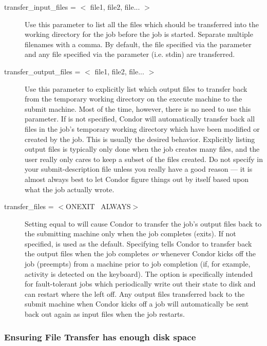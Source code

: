 \begin{description}

\item[transfer\_input\_files = $<$ file1, file2, file... $>$] Use this
parameter to list all the files which should be transferred into the 
working directory for the job before the job is started.  Separate multiple
filenames with a comma.  By default, the file specified via the
 parameter and any file specified via the 
parameter (i.e. stdin) are transferred.

\item[transfer\_output\_files = $<$ file1, file2, file... $>$] Use this
parameter to explicitly list which output files to transfer back from the
temporary working directory on the execute machine to the submit machine.
Most of the time, however, there is no need to use
this parameter.  If  is not
specified, Condor will automatically transfer back all files in the job's
temporary working directory which have been
modified or created by the job.  This is usually the desired behavior.
Explicitly listing output files is typically only done when the job creates
many files, and the user really only cares to keep a subset of
the files created. \Warn Do not specify  in your
submit-description file unless you really have a good reason --- it is
almost always best to let Condor figure things out by itself based upon what
the job actually wrote.

\item[transfer\_files = $<$ONEXIT \Bar\ ALWAYS$>$] Setting
 equal to  will cause Condor to transfer the
job's output files back to the submitting machine only when the job
completes (exits).  If not specified,  is used as the default.
Specifying  tells Condor to transfer back the output files when
the job completes \emph{or} whenever Condor kicks off the job (preempts)
from a machine prior to job completion (if, for example, activity is
detected on the keyboard).  The  option is specifically intended
for fault-tolerant jobs which periodically write out their state to disk and
can restart where the left off.  Any output files transferred back to the
submit machine when Condor kicks off a job will automatically be sent back
out again as input files when the job restarts.

\end{description}

\subsubsection{Ensuring File Transfer has enough disk space}

